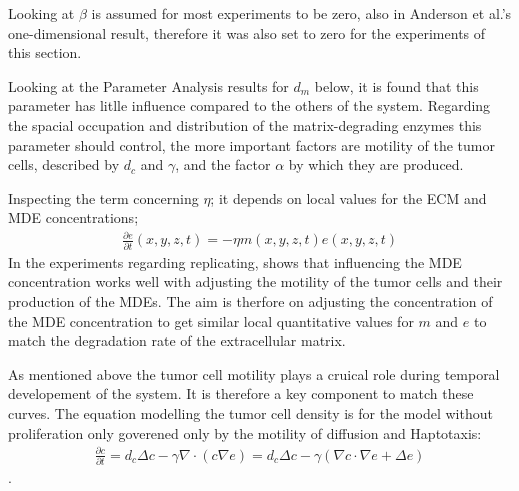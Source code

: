 Looking at $\beta$ is assumed for most experiments to be zero, also in Anderson et al.'s one-dimensional result, therefore it was also set to zero for the experiments of this section. 

Looking at the Parameter Analysis results for $d_m$ below, it is found that this parameter has litlle influence compared to the others of the system. Regarding the spacial occupation and distribution of the matrix-degrading enzymes this parameter should control, the more important factors are motility of the tumor cells, described by $d_c$ and $\gamma$, and the factor $\alpha$ by which they are produced. 

Inspecting the term concerning $\eta$; it depends on local values for the ECM and MDE concentrations; 
\begin{align*}
    \frac{\partial e}{\partial t}(x,y,z,t)=-\eta m(x,y,z,t)e(x,y,z,t)
\end{align*}    
In the experiments regarding replicating, shows that influencing the MDE concentration works well with adjusting the motility of the tumor cells and their production of the MDEs. The aim is therfore on adjusting the concentration of the MDE concentration to get similar local quantitative values for $m$ and $e$ to match the degradation rate of the extracellular matrix.

As mentioned above the tumor cell motility plays a cruical role during temporal developement of the system. It is therefore a key component to match these curves. The equation modelling the tumor cell density is for the model without proliferation only goverened only by the motility of diffusion and Haptotaxis: 
\begin{align*}
    \frac{\partial c}{\partial t} = d_c\Delta c - \gamma \nabla\cdot (c\nabla e)=d_c\Delta c - \gamma (\nabla c \cdot \nabla e + \Delta e)
\end{align*}.

